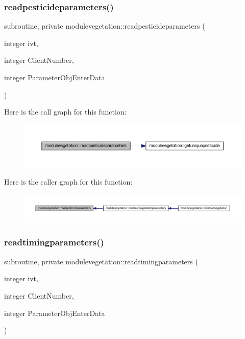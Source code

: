 \subsubsection{\texorpdfstring{readpesticideparameters()}{readpesticideparameters()}}
{\footnotesize\ttfamily subroutine, private modulevegetation\+::readpesticideparameters (\begin{DoxyParamCaption}\item[{integer}]{ivt,  }\item[{integer}]{Client\+Number,  }\item[{integer}]{Parameter\+Obj\+Enter\+Data }\end{DoxyParamCaption})\hspace{0.3cm}{\ttfamily [private]}}

Here is the call graph for this function\+:\nopagebreak
\begin{figure}[H]
\begin{center}
\leavevmode
\includegraphics[width=350pt]{namespacemodulevegetation_abfd09d09ab90a3303dcc3a496d57223a_cgraph}
\end{center}
\end{figure}
Here is the caller graph for this function\+:\nopagebreak
\begin{figure}[H]
\begin{center}
\leavevmode
\includegraphics[width=350pt]{namespacemodulevegetation_abfd09d09ab90a3303dcc3a496d57223a_icgraph}
\end{center}
\end{figure}
\mbox{\label{namespacemodulevegetation_a9b539132b7ee0190f99651024f4550ee}} 
\subsubsection{\texorpdfstring{readtimingparameters()}{readtimingparameters()}}
{\footnotesize\ttfamily subroutine, private modulevegetation\+::readtimingparameters (\begin{DoxyParamCaption}\item[{integer}]{ivt,  }\item[{integer}]{Client\+Number,  }\item[{integer}]{Parameter\+Obj\+Enter\+Data }\end{DoxyParamCaption})\hspace{0.3cm}{\ttfamily [private]}}

